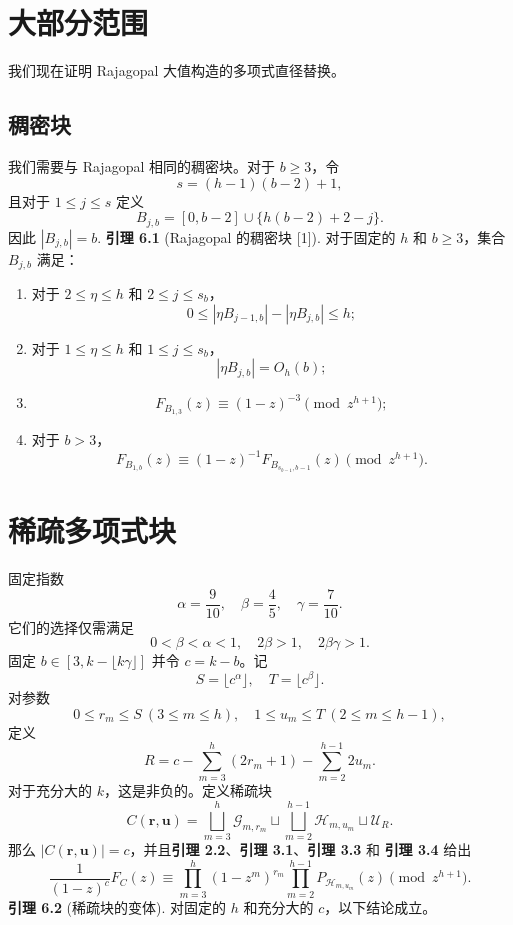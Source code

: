 \documentclass[11pt]{article}
\theoremstyle{break}
\begin{document}
\section{大部分范围}

我们现在证明 Rajagopal 大值构造的多项式直径替换。
\subsection{稠密块}
我们需要与 Rajagopal 相同的稠密块。对于 \(b \ge 3\)，令
\[
s = (h-1)(b-2)+1,
\]
且对于 \(1 \le j \le s\) 定义
\[
B_{j,b} = [0, b-2] \cup \{h(b-2)+2-j\}.
\]
因此 \(|B_{j,b}| = b\).
\textbf{引理 6.1} (Rajagopal 的稠密块 [1]). 对于固定的 $h$ 和 $b \ge 3$，集合 $B_{j,b}$ 满足：
\begin{enumerate}
\item[(a)] 对于 $2 \le \eta \le h$ 和 $2 \le j \le s_b$，
\[ 0 \le |\eta B_{j-1,b}| - |\eta B_{j,b}| \le h; \]
\item[(b)] 对于 $1 \le \eta \le h$ 和 $1 \le j \le s_b$，
\[ |\eta B_{j,b}| = O_h(b); \]
\item[(c)] 
\[ F_{B_{1,3}}(z) \equiv (1-z)^{-3} \pmod{z^{h+1}}; \]
\item[(d)] 对于 $b > 3$，
\[ F_{B_{1,b}}(z) \equiv (1-z)^{-1} F_{B_{s_{b-1},b-1}}(z) \pmod{z^{h+1}}. \]
\end{enumerate}
\section{稀疏多项式块}
固定指数
\[ \alpha = \frac{9}{10}, \quad \beta = \frac{4}{5}, \quad \gamma = \frac{7}{10}. \]
它们的选择仅需满足
\[ 0 < \beta < \alpha < 1, \quad 2\beta > 1, \quad 2\beta\gamma > 1. \]
固定 \( b \in [3, k - \lfloor k\gamma \rfloor] \) 并令 \( c = k - b \)。记
\[ S = \lfloor c^{\alpha} \rfloor, \quad T = \lfloor c^{\beta} \rfloor. \]
对参数
\[ 0 \le r_m \le S \ (3 \le m \le h), \quad 1 \le u_m \le T \ (2 \le m \le h-1), \]
定义
\[ R = c - \sum_{m=3}^{h} (2r_m + 1) - \sum_{m=2}^{h-1} 2u_m. \]
对于充分大的 \( k \)，这是非负的。定义稀疏块
\[ C(\mathbf{r}, \mathbf{u}) = \bigsqcup_{m=3}^{h} \mathcal{G}_{m, r_m} \sqcup \bigsqcup_{m=2}^{h-1} \mathcal{H}_{m, u_m} \sqcup \mathcal{U}_R. \]
那么 \( |C(\mathbf{r}, \mathbf{u})| = c \)，并且\textbf{引理 2.2}、\textbf{引理 3.1}、\textbf{引理 3.3} 和 \textbf{引理 3.4} 给出
\[ \frac{1}{(1-z)^c} F_{C}(z) \equiv \prod_{m=3}^{h} (1 - z^m)^{r_m} \prod_{m=2}^{h-1} P_{\mathcal{H}_{m, u_m}}(z) \pmod{z^{h+1}}. \tag{1} \]
\textbf{引理 6.2} (稀疏块的变体). 对固定的 $h$ 和充分大的 $c$，以下结论成立。
\end{document}
